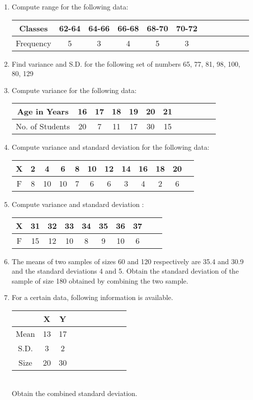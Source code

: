 \documentclass[14pt]{article}
\begin{document}
\begin{multicols}{2}
\begin{enumerate}[resume]
\item Compute range for the following data:

\begin{tabular}{|c|*{11}{c|}}
\hline Classes & 62-64 & 64-66 & 66-68 & 68-70 & 70-72  \\
\hline Frequency  & 5 & 3 & 4 & 5 & 3 \\
\hline
\end{tabular}


\item Find variance and S.D. for the following set of numbers 65, 77, 81, 98, 100, 80, 129

\item Compute variance for the following data:

\begin{tabular}{|c|*{11}{c|}}
\hline Age in Years & 16 & 17 & 18 & 19 & 20 & 21  \\
\hline No. of Students  & 20 & 7 & 11 & 17 &30 & 15  \\
\hline
\end{tabular}

\item Compute variance and standard deviation for the following data:

\begin{tabular}{|c|*{11}{c|}}
\hline X & 2 & 4 & 6 & 8 & 10 & 12 & 14 & 16 & 18 & 20  \\
\hline F & 8 & 10 & 10 & 7 & 6 & 6 & 3 & 4 & 2 & 6 \\
\hline
\end{tabular}

\item Compute variance and standard deviation :

\begin{tabular}{|c|*{9}{c|}}
\hline X & 31 & 32 & 33 & 34 & 35 & 36 & 37 \\
\hline F & 15 & 12 & 10 & 8 & 9 & 10 & 6 \\
\hline
\end{tabular}

\item The means of two samples of sizes 60 and 120 respectively are 35.4 and 30.9 and the standard deviations 4 and 5. Obtain the standard deviation of the sample of size 180 obtained by combining the two sample.


\item For a certain data, following information is available.

\begin{tabular}{|c|*{9}{c|}}
\hline  & X & Y  \\
\hline Mean & 13 & 17  \\
\hline S.D. & 3 & 2  \\
\hline Size & 20 & 30  \\
\hline
\end{tabular}\\
\vspace{1mm}
Obtain the combined standard deviation.


\end{enumerate}
\end{multicols}
\end{document}
